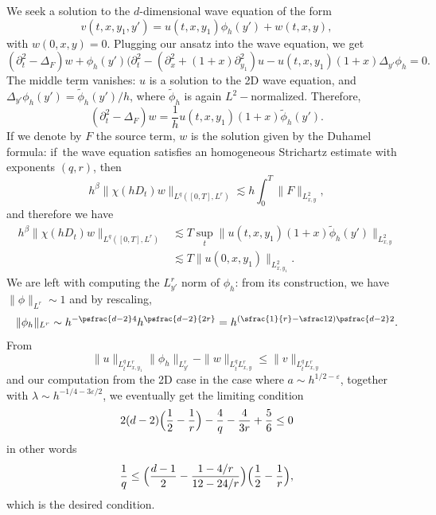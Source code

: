 We seek a solution to the $d$-dimensional wave equation of the form\vspace*{-3pt}
\[
v(t,x,y_{1},y')=u(t,x,y_{1}) \phi_{h}(y')+w(t,x,y),
\]
with $w(0,x,y)=0$. Plugging our ansatz into the wave equation, we get
\[
(\partial_{t}^{2} -\Delta_{F}) w+\phi_{h}(y')(\partial_{t}^{2} -(\partial_{x}^{2}+(1+x)\partial^{2}_{y_{1}}) u -u(t,x,y_{1}) (1+x)\Delta_{y'} \phi_{h}=0.
\]
The middle term vanishes: $u$ is a solution to the 2D wave equation, and $\Delta_{y'} \phi_{h}(y')= \tilde \phi_{h}(y') /h$, where $\tilde \phi_{h}$ is again $L^{2}-$normalized. Therefore,\vspace*{-3pt}
\[
(\partial_{t}^{2} -\Delta_{F}) w= \frac 1 h u(t,x,y_{1}) (1+x)\tilde \phi_{h}(y').
\]
If we denote by $F$ the source term, $w$ is the solution given by the Duhamel formula: if~the wave equation satisfies an homogeneous Strichartz estimate with exponents $(q,r)$, then\vspace*{-3pt}
\begin{equation*}\label{stricrdinhomo}
h^{\beta}\|\chi(hD_t)w\|_{L^q([0,T],
L^r)}\lesssim h \int_{0}^{T}\|F\|_{L^{2}_{x,y}},
\end{equation*}
and therefore we have
\begin{align*}
h^{\beta}\|\chi(hD_t)w\|_{L^q([0,T],
L^r)} & \lesssim T \sup_{t}\| u(t,x,y_{1}) (1+x)\tilde \phi_{h}(y')\|_{L^{2}_{x,y}}\\
& \lesssim T \| u(0,x,y_{1}) \|_{L^{2}_{x,y_{1}}}.
\end{align*}
We are left with computing the $L^{r}_{y'}$ norm of $ \phi_{h}$: from its construction, we have \hbox{$\|\phi\|_{L^{r}}\sim 1$} and by rescaling,
\[
\|\phi_h\|_{L^{r}}\sim h^{-\psfrac{d-2} 4} h^{\psfrac{d-2} {2r}}=h^{(\sfrac{1} {r}-\sfrac 1 2)\psfrac{d-2} 2}.
\]
From
\[
\|u\|_{L^{q}_{t}L^{r}_{x,y_{1}}} \|\phi_{h}\|_{L^{r}_{y'}} -\|w\|_{L^{q}_{t}L^{r}_{x,y}}\leq \|v\|_{L^{q}_{t}L^{r}_{x,y}}
\]
and our computation from the 2D case in the case where $a\sim h^{1/2-\varepsilon}$, together with $\lambda \sim h^{-1/4-3\varepsilon/2}$, we eventually get the limiting condition
\[
2(d-2)\Bigl(\frac 1 2-\frac 1 r\Bigr)- \frac 4{q}-\frac{4}{3r}+\frac 5 6\leq 0
\]
in other words
\[
\frac 1 q \leq \Bigl(\frac {d-1} 2 -\frac {1-4/r}{12-24/r}\Bigr) \Bigl(\frac 1 2 -\frac 1 r\Bigr),
\]
which is the desired condition.


